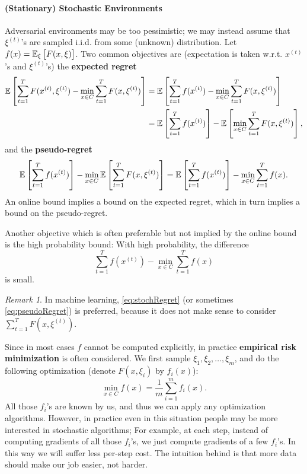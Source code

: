 \documentclass[openany]{book}
\theoremstyle{definition}
\theoremstyle{remark}
\newtheorem*{remark}{Remark}
\begin{document}
\paragraph{(Stationary) Stochastic Environments}
Adversarial environments may be too pessimistic; we may instead assume that $\xi^{(t)}$'s are sampled i.i.d. from some (unknown) distribution. Let $f(x)=\mathbb{E}_{\xi}\sbr{F(x,\xi)}$. Two common objectives are (expectation is taken w.r.t. $x^{(t)}$'s and $\xi^{(t)}$'s) the \textbf{expected regret}
\begin{equation}\label{eq:expectRegret}
    \begin{split}
        \mathbb{E}\sbr{\sum_{t=1}^{T}F(x^{(t)},\xi^{(t)})-\min_{x\in C}\sum_{t=1}^{T}F(x,\xi^{(t)})} & = \mathbb{E}\sbr{\sum_{t=1}^{T}f(x^{(t)})-\min_{x\in C}\sum_{t=1}^{T}F(x,\xi^{(t)})} \\
         & =\mathbb{E}\sbr{\sum_{t=1}^{T}f(x^{(t)})}-\mathbb{E}\sbr{\min_{x\in C}\sum_{t=1}^{T}F(x,\xi^{(t)})},
    \end{split}
\end{equation}
and the \textbf{pseudo-regret}
\begin{equation}\label{eq:pseudoRegret}
    \mathbb{E}\sbr{\sum_{t=1}^{T}f(x^{(t)})}-\min_{x\in C}\mathbb{E}\sbr{\sum_{t=1}^{T}F(x,\xi^{(t)})}=\mathbb{E}\sbr{\sum_{t=1}^{T}f(x^{(t)})}-\min_{x\in C}\sum_{t=1}^{T}f(x).
\end{equation}
An online bound implies a bound on the expected regret, which in turn implies a bound on the pseudo-regret.

Another objective which is often preferable but not implied by the online bound is the high probability bound: With high probability, the difference
\begin{equation}\label{eq:stochRegret}
    \sum_{t=1}^{T}f(x^{(t)})-\min_{x\in C}\sum_{t=1}^{T}f(x)
\end{equation}
is small.
\begin{remark}
    In machine learning, \eqref{eq:stochRegret} (or sometimes \eqref{eq:pseudoRegret}) is preferred, because it does not make sense to consider $\sum_{t=1}^{T}F(x,\xi^{(t)})$.
\end{remark}

Since in most cases $f$ cannot be computed explicitly, in practice \textbf{empirical risk minimization} is often considered. We first sample $\xi_1,\xi_2,\ldots,\xi_m$, and do the following optimization (denote $F(x,\xi_i)$ by $f_i(x)$):
\begin{equation}\label{finiteSum}
    \min_{x\in C}f(x)=\frac{1}{m}\sum_{i=1}^{m}f_i(x).
\end{equation}
All those $f_i$'s are known by us, and thus we can apply any optimization algorithms. However, in practice even in this situation people may be more interested in stochastic algorithms; For example, at each step, instead of computing gradients of all those $f_i$'s, we just compute gradients of a few $f_i$'s. In this way we will suffer less per-step cost. The intuition behind is that more data should make our job easier, not harder.
\end{document}
